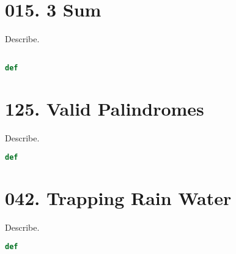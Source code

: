 \documentclass{article}
\begin{document}
\section{015. 3 Sum}
\begin{tcolorbox}[colback=red!5!white, colframe=red!50!black,title=015. 3 Sum ] 
Describe.
\end{tcolorbox}
\begin{lstlisting}[language=Python]

def 

\end{lstlisting}
\section{125. Valid Palindromes}
\begin{tcolorbox}[colback=red!5!white, colframe=red!50!black,title=125. Valid Palindromes ] 
Describe.
\end{tcolorbox}
\begin{lstlisting}[language=Python]
def 

\end{lstlisting}
\section{042. Trapping Rain Water}
\begin{tcolorbox}[colback=red!5!white, colframe=red!50!black,title=042. Trapping Rain Water ] 
Describe.
\end{tcolorbox}
\begin{lstlisting}[language=Python]
def 

\end{lstlisting}
\end{document}
